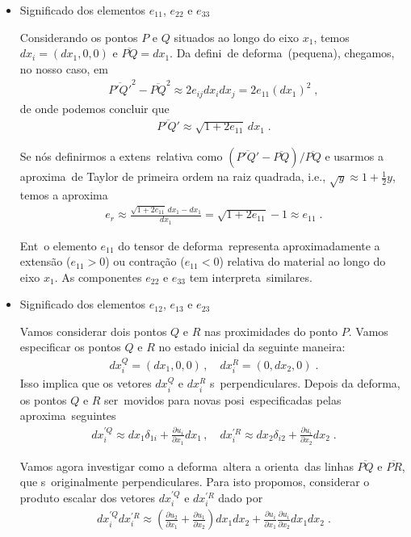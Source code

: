 \begin{itemize}
\item Significado  dos elementos $e_{11}$, $e_{22}$ e
$e_{33}$

Considerando os pontos $P$ e $Q$ situados ao longo do eixo
$x_1$, temos $dx_i = (dx_1,0,0)$ e $\overline{PQ} = dx_1$.
Da defini\cao\ de deforma\cao\ (pequena), chegamos, no
nosso caso, em
\begin{eqnarray}
\overline{P'Q'}^2 -\overline{PQ}^2 \approx  2e_{ij}dx_idx_j
= 2e_{11}(dx_1)^2 \; ,
\end{eqnarray}
de onde podemos concluir que
\begin{eqnarray}
\overline{P'Q'} \approx  \sqrt{1 + 2 e_{11}}\,dx_1 \; .
\end{eqnarray}

Se n\'os definirmos a extens\ao\ relativa como
$(\overline{P'Q'}-\overline{PQ}) / \overline{PQ}$ e usarmos
a aproxima\cao\ de Taylor de primeira ordem na raiz quadrada, i.e.,
$\sqrt{y}\approx 1 + \frac{1}{2}y$, temos a aproxima\cao
\begin{eqnarray}
e_r \approx  \frac{\sqrt{1+2 e_{11}}\,dx_1-dx_1}{dx_1}
= \sqrt{1+2 e_{11}} - 1 \approx e_{11} \; .
\end{eqnarray}

Ent\ao\ o elemento $e_{11}$ do tensor de deforma\cao\
    representa aproximadamente a extens\~ao ($e_{11}>0$) ou contra\c{c}\~ao
    ($e_{11}<0$)
relativa do material ao longo do eixo $x_1$. As
componentes $e_{22}$ e $e_{33}$ tem interpreta\coes\
similares.

\item Significado  dos elementos $e_{12}$, $e_{13}$ e
$e_{23}$

Vamos considerar dois pontos $Q$ e $R$ nas proximidades
do ponto $P$. Vamos especificar os pontos $Q$ e $R$ no
estado inicial da seguinte maneira:
\begin{eqnarray}
dx_i^{Q}=(dx_1,0,0)\, , \quad dx_i^{R}
=(0,dx_2,0) \; .
\end{eqnarray}
Isso implica que os vetores $dx_i^Q$ e $dx_i^R$ s\ao\ perpendiculares.
Depois da deforma\cao, os pontos $Q$ e $R$ ser\ao\ movidos
para novas posi\coes\ especificadas pelas aproxima\coes\
seguintes
\begin{eqnarray}
dx_i^{'Q} \approx  dx_1 \delta_{1i} + \frac{\partial u_i}
{\partial x_1} dx_1
\, , \quad
dx_i^{'R} \approx  dx_2 \delta_{i2} + \frac{\partial u_i}
{\partial x_2} dx_2 \; .
\end{eqnarray}

Vamos agora investigar como a deforma\cao\ altera a orienta\cao\
das linhas $\overline{PQ}$ e $\overline{PR}$, que s\ao\
originalmente perpendiculares. Para isto propomos, considerar o
produto escalar dos vetores $dx_i^{'Q}$ e $dx_i^{'R}$ dado por
\begin{eqnarray}
dx_i^{'Q} dx_i^{'R} \approx  \left( \frac{\partial u_2}{\partial x_1}
+ \frac{\partial u_1}{\partial x_2}\right) dx_1 dx_2 +
\frac{\partial u_i}{\partial x_1}  \frac{\partial u_i}
{\partial x_2} dx_1 dx_2 \; .
\end{eqnarray}


\end{itemize}
